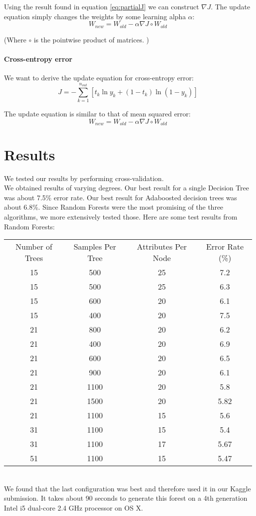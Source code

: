 \documentclass[11pt]{article}
\begin{document}
Using the result found in equation  \eqref{eq:partialJ} we can construct $\nabla J$. The update equation simply changes the weights by some learning alpha $\alpha$:
\[
	W_{new} = W_{old} - \alpha \nabla J \circ W_{old}
\]  

(Where $\circ$ is the pointwise product of matrices. )

\paragraph{Cross-entropy error} We want to derive the update equation for cross-entropy error:
\[
	J = - \sum_{k=1}^{n_{out}}\left[t_k \ln y_k + \left(1- t_k \right)\ln \left( 1- y_k \right) \right]
\]

The update equation is similar to that of mean squared error:
\[
	W_{new} = W_{old} - \alpha \nabla J \circ W_{old}
\]  
\section{Results}

We tested our results by performing cross-validation. \\

We obtained results of varying degrees. Our best result for a single Decision Tree was about 7.5\% error rate. Our best result for Adaboosted decision trees was about 6.8\%. Since Random Forests were the most promising of the three algorithms, we more extensively tested those. Here are some test results from Random Forests: \\

\begin{tabular}{|c|c|c||c|}
\hline
Number of Trees & Samples Per Tree & Attributes Per Node & Error Rate (\%)\\
15 & 500 & 25 & 7.2 \\
15 & 500 & 25 & 6.3 \\
15 & 600 & 20 & 6.1 \\
15 & 400 & 20 & 7.5 \\
21 & 800 & 20 & 6.2 \\
21 & 400 & 20 & 6.9 \\
21 & 600 & 20 & 6.5 \\
21 & 900 & 20 & 6.1 \\
21 & 1100 & 20 & 5.8 \\
21 & 1500 & 20 & 5.82 \\
21 & 1100 & 15 & 5.6 \\
31 & 1100 & 15 & 5.4 \\
31 & 1100 & 17 & 5.67 \\
51 & 1100 & 15 & 5.47 \\
\hline
\end{tabular}
\vspace{11pt}
\\
We found that the last configuration was best and therefore used it in our Kaggle submission. It takes about 90 seconds to generate this forest on a 4th generation Intel i5 dual-core 2.4 GHz processor on OS X. 
\end{document}
